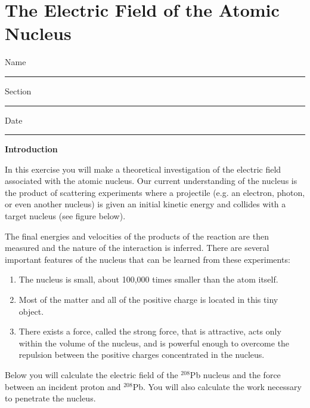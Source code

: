 
\section{The Electric Field of the Atomic Nucleus}

Name \rule{2.0in}{0.1pt}\hfill{}Section \rule{1.0in}{0.1pt}\hfill{}Date
\rule{1.0in}{0.1pt}

\textbf{Introduction}

In this exercise you will make a theoretical investigation of the
electric field associated with the atomic nucleus. Our current understanding
of the nucleus is the product of scattering experiments where a projectile
(e.g. an electron, photon, or even another nucleus) is given an initial
kinetic energy and collides with a target nucleus (see figure below). 

\vspace{0.3cm}
{\centering {} \par}
\vspace{0.3cm}

The final energies and velocities of the products of the reaction
are then measured and the nature of the interaction is inferred. There
are several important features of the nucleus that can be learned
from these experiments:

\begin{enumerate}
\item The nucleus is small, about 100,000 times smaller than the atom itself.
\item Most of the matter and all of the positive charge is located in this
tiny object.
\item There exists a force, called the strong force, that is attractive,
acts only within the volume of the nucleus, and is powerful enough
to overcome the repulsion between the positive charges concentrated
in the nucleus. 
\end{enumerate}
Below you will calculate the electric field of the \( ^{208} \)Pb
nucleus and the force between an incident proton and \( ^{208} \)Pb.
You will also calculate the work necessary to penetrate the nucleus.

